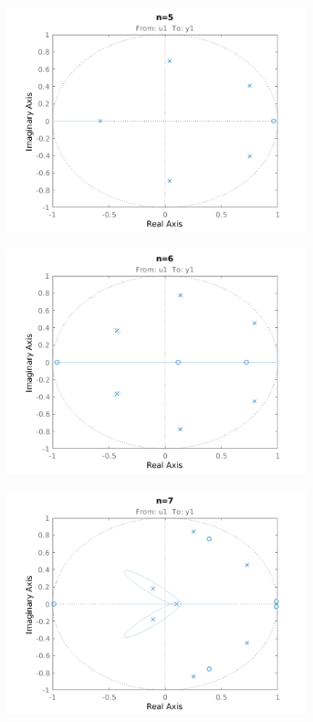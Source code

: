 \documentclass{scrartcl}
\begin{document}
\begin{figure}[h]
	\centering
	\begin{subfigure}{.49\textwidth}
		\includegraphics[height=6.5cm]{figures/zp5.pdf}
		\label{fig:zp5}
	\end{subfigure}\hfill
	\begin{subfigure}{.49\textwidth}
		\includegraphics[height=6.5cm]{figures/zp6.pdf}
		\label{fig:zp6}
	\end{subfigure}
	\begin{subfigure}{.49\textwidth}
		\includegraphics[height=6.5cm]{figures/zp7.pdf}

\end{subfigure}
\end{figure}
\end{document}
